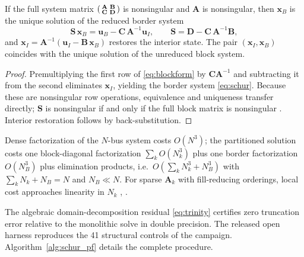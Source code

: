 \begin{theorem}
\label{thm:schur}
If the full system matrix $\begin{psmallmatrix} \mathbf{A} & \mathbf{B} \\ \mathbf{C} & \mathbf{D} \end{psmallmatrix}$ is nonsingular and $\mathbf{A}$ is nonsingular, then $\mathbf{x}_B$ is the unique solution of the reduced border system
\begin{equation}
\mathbf{S}\, \mathbf{x}_B = \mathbf{u}_B - \mathbf{C}\, \mathbf{A}^{-1} \mathbf{u}_I, \qquad \mathbf{S} = \mathbf{D} - \mathbf{C}\, \mathbf{A}^{-1} \mathbf{B},
\label{eq:schur}
\end{equation}
and $\mathbf{x}_I = \mathbf{A}^{-1}(\mathbf{u}_I - \mathbf{B}\, \mathbf{x}_B)$ restores the interior state. The pair $(\mathbf{x}_I, \mathbf{x}_B)$ coincides with the unique solution of the unreduced block system.
\end{theorem}
\begin{proof}
Premultiplying the first row of \eqref{eq:blockform} by $\mathbf{C}\mathbf{A}^{-1}$ and subtracting it from the second eliminates $\mathbf{x}_I$, yielding the border system \eqref{eq:schur}. Because these are nonsingular row operations, equivalence and uniqueness transfer directly; $\mathbf{S}$ is nonsingular if and only if the full block matrix is nonsingular \cite{zhang2005}. Interior restoration follows by back-substitution.
\end{proof}

\begin{proposition}[complexity]
\label{prop:complexity}
Dense factorization of the $N$-bus system costs $O(N^3)$; the partitioned solution costs one block-diagonal factorization $\sum_k O(N_k^3)$ plus one border factorization $O(N_B^3)$ plus elimination products, i.e.\ $O\!\left(\sum_k N_k^3 + N_B^3\right)$ with $\sum_k N_k + N_B = N$ and $N_B \ll N$. For sparse $\mathbf{A}_k$ with fill-reducing orderings, local cost approaches linearity in $N_k$ \cite{george1973}, \cite{saad2003}.
\end{proposition}

The algebraic domain-decomposition residual \eqref{eq:trinity} certifies zero truncation error relative to the monolithic solve in double precision. The released open harness reproduces the 41 structural controls of the campaign. Algorithm~\ref{alg:schur_pf} details the complete procedure.

